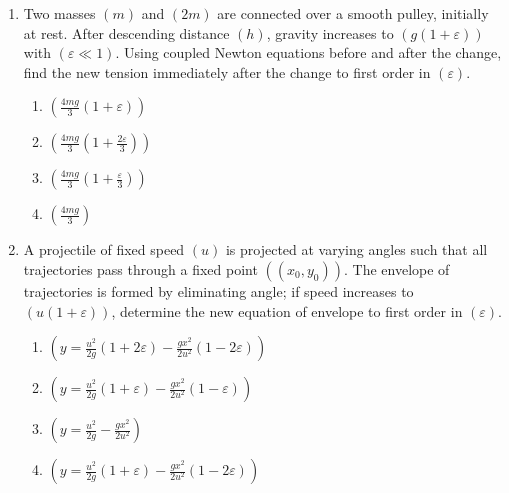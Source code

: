 \documentclass[12pt]{article}
\begin{document}
\begin{enumerate}
\item Two masses $(m)$ and $(2m)$ are connected over a smooth pulley, initially at rest. After descending distance $(h)$, gravity increases to $(g(1+\varepsilon))$ with $(\varepsilon\ll1)$. Using coupled Newton equations before and after the change, find the new tension immediately after the change to first order in $(\varepsilon)$.




\begin{center}
\end{center}

\begin{enumerate}[label=\Alph*)]
\item $\left(\frac{4mg}{3}(1+\varepsilon)\right)$
\item $\left(\frac{4mg}{3}\left(1+\frac{2\varepsilon}{3}\right)\right)$
\item $\left(\frac{4mg}{3}\left(1+\frac{\varepsilon}{3}\right)\right)$
\item $\left(\frac{4mg}{3}\right)$
\end{enumerate}

\item A projectile of fixed speed $(u)$ is projected at varying angles such that all trajectories pass through a fixed point $((x_0,y_0))$. The envelope of trajectories is formed by eliminating angle; if speed increases to $(u(1+\varepsilon))$, determine the new equation of envelope to first order in $(\varepsilon)$.

\begin{enumerate}[label=\Alph*)]
\item $\left(y=\frac{u^2}{2g}(1+2\varepsilon)-\frac{g x^2}{2u^2}(1-2\varepsilon)\right)$
\item $\left(y=\frac{u^2}{2g}(1+\varepsilon)-\frac{g x^2}{2u^2}(1-\varepsilon)\right)$
\item $\left(y=\frac{u^2}{2g}-\frac{g x^2}{2u^2}\right)$
\item $\left(y=\frac{u^2}{2g}(1+\varepsilon)-\frac{g x^2}{2u^2}(1-2\varepsilon)\right)$
\end{enumerate}


\end{enumerate}
\end{document}
